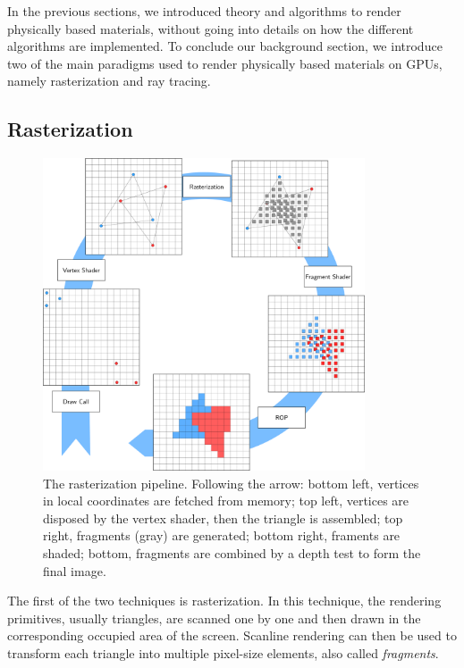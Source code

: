 In the previous sections, we introduced theory and algorithms to render physically based materials, without going into details on how the different algorithms are implemented. To conclude our background section, we introduce two of the main paradigms used to render physically based materials on GPUs, namely rasterization and ray tracing. 

\subsection{Rasterization}

\begin{figure}
\centering
	 \includegraphics[width=0.85\textwidth]{figures/rasterization_pipeline.pdf} 
\caption{The rasterization pipeline. Following the arrow: bottom left, vertices in local coordinates are fetched from memory; top left, vertices are disposed by the vertex shader, then the triangle is assembled; top right, fragments (gray) are generated; bottom right, framents are shaded; bottom, fragments are combined by a depth test to form the final image. } 
\label{fig:rasterpipeline}
\end{figure}

The first of the two techniques is rasterization. In this technique, the rendering primitives, usually triangles, are scanned one by one and then drawn in the corresponding occupied area of the screen. Scanline rendering can then be used to transform each triangle into multiple pixel-size elements, also called \emph{fragments}. 

